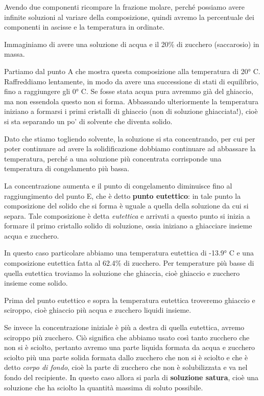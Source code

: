 Avendo due componenti ricompare la frazione molare, perché possiamo avere infinite soluzioni al variare della composizione, quindi avremo la percentuale dei componenti in ascisse e la temperatura in ordinate.

Immaginiamo di avere una soluzione di acqua e il 20\% di zucchero (saccarosio) in massa.

Partiamo dal punto A che mostra questa composizione alla temperatura di 20° C. Raffreddiamo lentamente, in modo da avere una successione di stati di equilibrio, fino a raggiungere gli 0° C. Se fosse stata acqua pura avremmo già del ghiaccio, ma non essendola questo non si forma. Abbassando ulteriormente la temperatura iniziano a formarsi i primi cristalli di ghiaccio (non di soluzione ghiacciata!), cioè si sta separando un po' di solvente che diventa solido.

Dato che stiamo togliendo solvente, la soluzione si sta concentrando, per cui per poter continuare ad avere la solidificazione dobbiamo continuare ad abbassare la temperatura, perché a una soluzione più concentrata corrisponde una temperatura di congelamento più bassa.

La concentrazione aumenta e il punto di congelamento diminuisce fino al raggiungimento del punto E, che è detto \textbf{punto eutettico}: in tale punto la composizione del solido che si forma è uguale a quella della soluzione da cui si separa. Tale composizione è detta \textit{eutettica} e arrivati a questo punto si inizia a formare il primo cristallo solido di soluzione, ossia iniziano a ghiacciare insieme acqua e zucchero.

In questo caso particolare abbiamo una temperatura eutettica di -13.9° C e una composizione eutettica fatta al 62.4\% di zucchero. Per temperature più basse di quella eutettica troviamo la soluzione che ghiaccia, cioè ghiaccio e zucchero insieme come solido.

Prima del punto eutettico e sopra la temperatura eutettica troveremo ghiaccio e sciroppo, cioè ghiaccio più acqua e zucchero liquidi insieme.

Se invece la concentrazione iniziale è più a destra di quella eutettica, avremo sciroppo più zucchero. Ciò significa che abbiamo usato così tanto zucchero che non si è sciolto, pertanto avremo una parte liquida formata da acqua e zucchero sciolto più una parte solida formata dallo zucchero che non si è sciolto e che è detto \textit{corpo di fondo}, cioè la parte di zucchero che non è solubilizzata e va nel fondo del recipiente. In questo caso allora si parla di \textbf{soluzione satura}, cioè una soluzione che ha sciolto la quantità massima di soluto possibile.

